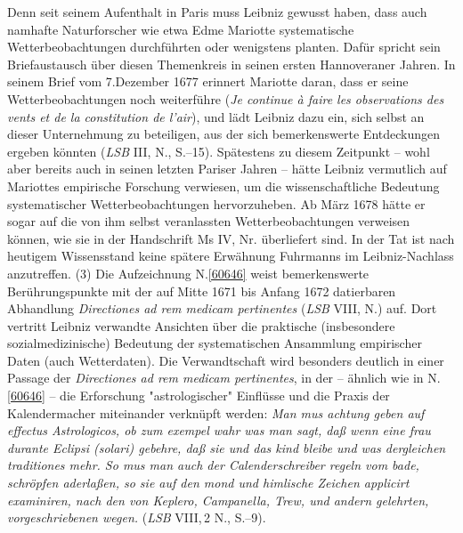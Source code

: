 Denn seit seinem Aufenthalt in Paris muss Leibniz gewusst haben, dass auch namhafte Naturforscher wie etwa Edme Mariotte systematische Wetterbeobachtungen durchführten oder wenigstens planten.
Dafür spricht sein Briefaustausch über diesen Themenkreis in seinen ersten Hannoveraner Jahren.
In seinem Brief vom 7.\;Dezember 1677 erinnert Mariotte daran, dass er seine Wetterbeobachtungen noch weiterführe (\textit{Je continue à faire les observations des vents et de la constitution de l'air}), und lädt Leibniz dazu ein, sich selbst an dieser Unternehmung zu beteiligen, aus der sich bemerkenswerte Entdeckungen ergeben könnten (\textit{LSB} III, N., S.--15).\cite{02551}
Spätestens zu diesem Zeitpunkt -- wohl aber bereits auch in seinen letzten Pariser Jahren -- hätte Leibniz vermutlich auf Mariottes empirische Forschung verwiesen, um die wissenschaftliche Bedeutung systematischer Wetterbeobachtungen hervorzuheben.
Ab März 1678 hätte er sogar auf die von ihm selbst veranlassten Wetterbeobachtungen verweisen können, wie sie in der Handschrift Ms IV, Nr. überliefert sind. %
In der Tat ist nach heutigem Wissensstand keine spätere Erwähnung Fuhrmanns im Leibniz-Nachlass anzutreffen.
\pend%
\pstart%
(3) Die Aufzeichnung N.\;\ref{60646} weist bemerkenswerte Berührungspunkte mit der auf Mitte 1671 bis Anfang 1672 datierbaren Abhandlung \textit{Directiones ad rem medicam pertinentes} (\textit{LSB} VIII, N.)\cite{01131} auf.
Dort vertritt Leibniz verwandte Ansichten über die praktische (insbesondere sozialmedizinische) Bedeutung der systematischen Ansammlung empirischer Daten (auch Wetterdaten). %
Die Verwandtschaft wird besonders deutlich in einer Passage der \textit{Directiones ad rem medicam pertinentes}, in der -- ähnlich wie in N.\;\ref{60646} -- die Erforschung "astrologischer" Einflüsse und die Praxis der Kalendermacher miteinander verknüpft werden:
\textit{Man mus achtung geben auf effectus Astrologicos, ob zum exempel wahr was man sagt, daß wenn eine frau durante Eclipsi (solari) gebehre, daß sie und das kind bleibe und was dergleichen traditiones mehr. So mus man auch der Calenderschreiber regeln vom bade, schröpfen aderlaßen, so sie auf den mond und himlische Zeichen applicirt examiniren, nach den von Keplero, Campanella, Trew, und andern gelehrten, vorgeschriebenen wegen.} (\textit{LSB} VIII,\,2 N., S.--9).\cite{01131}
